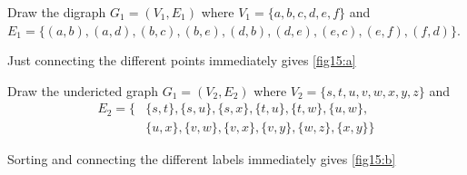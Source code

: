 \documentclass[a4paper, english, 12pt]{article} %
\begin{document}
\begin{problem}[15]
  \begin{subproblem}
    Draw the digraph $G_1 = (V_1, E_1)$ where $V_1 = \{a,b,c,d,e,f\}$ and \\ $E_1 =
    \{(a,b), (a,d), (b,c), (b,e), (d,b), (d,e), (e,c), (e,f), (f,d)\}$.
  \end{subproblem} 
\end{problem}

\begin{answer}
  Just connecting the different points immediately gives \cref{fig15:a}
\end{answer}

\begin{FigureH}
  \centering
  \caption{}
  \label{fig15:a}
\end{FigureH}

\begin{subproblem}
  Draw the undericted graph $G_1 = (V_2, E_2)$ where $V_2 = \{s,t,u,v,w,x,y,z\}$
  and
  \begin{align*}
  E_2 = \{ & \{s,t\}, \{s,u\}, \{s,x\}, \{t,u\}, \{t,w\}, \{u,w\}, \\
           & \{u,x\}, \{v,w\}, \{v,x\}, \{v,y\}, \{w,z\}, \{x,y\} \}
  \end{align*}
\end{subproblem}

\begin{answer}
  Sorting and connecting the different labels immediately gives \cref{fig15:b} 
\end{answer}
\end{document}
